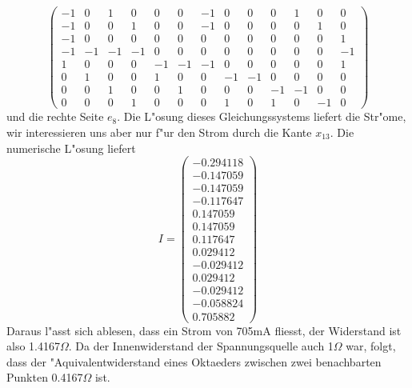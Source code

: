 \begin{loesung}
\[\begin{pmatrix}
-1& 0& 1& 0& 0& 0&-1& 0& 0& 0& 1& 0& 0\\
-1& 0& 0& 1& 0& 0&-1& 0& 0& 0& 0& 1& 0\\
-1& 0& 0& 0& 0& 0& 0& 0& 0& 0& 0& 0& 1\\
-1&-1&-1&-1& 0& 0& 0& 0& 0& 0& 0& 0&-1\\
 1& 0& 0& 0&-1&-1&-1& 0& 0& 0& 0& 0& 1\\
 0& 1& 0& 0& 1& 0& 0&-1&-1& 0& 0& 0& 0\\
 0& 0& 1& 0& 0& 1& 0& 0& 0&-1&-1& 0& 0\\
 0& 0& 0& 1& 0& 0& 0& 1& 0& 1& 0&-1& 0
\end{pmatrix}
\]
%
%
und die rechte Seite $e_8$. Die L"osung dieses Gleichungssystems liefert die
Str"ome, wir interessieren uns aber nur f"ur den Strom durch die
Kante $x_{13}$. Die numerische L"osung liefert
\[
I=\begin{pmatrix}
  -0.294118\\
  -0.147059\\
  -0.147059\\
  -0.117647\\
   0.147059\\
   0.147059\\
   0.117647\\
   0.029412\\
  -0.029412\\
   0.029412\\
  -0.029412\\
  -0.058824\\
   0.705882
\end{pmatrix}
\]
Daraus l"asst sich ablesen, dass ein Strom von 705mA fliesst,
der Widerstand ist also 1.4167$\Omega$. Da der Innenwiderstand
der Spannungsquelle auch 1$\Omega$ war, folgt, dass der "Aquivalentwiderstand
eines Oktaeders zwischen zwei benachbarten Punkten 0.4167$\Omega$ ist.
\end{loesung}


